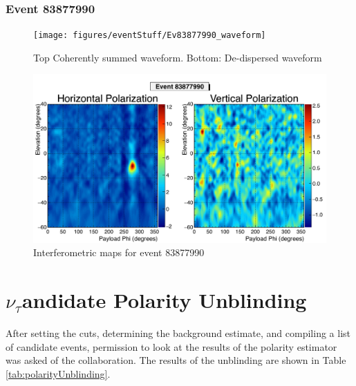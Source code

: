 		\subsubsection{Event 83877990}
		\begin{figure}
		\centering
			\texttt{[image: figures/eventStuff/Ev83877990\_waveform]}
			\caption{Top Coherently summed waveform.  Bottom: De-dispersed waveform} 
		\label{fig:Ev83877990_waveform}
		\end{figure}
		
		\begin{figure}
		\centering
			\includegraphics[width=\textwidth]{figures/intMap/intMap_ev83877990}
			\caption{Interferometric maps for event 83877990} 
		\label{fig:Ev83877990_map}
		\end{figure}			





\section{\texorpdfstring{$\nu_{\tau}$} Candidate Polarity Unblinding}
	After setting the cuts, determining the background estimate, and compiling a list of candidate events, permission to look at the results of the polarity estimator was asked of the collaboration.  The results of the unblinding are shown in Table \ref{tab:polarityUnblinding}.

